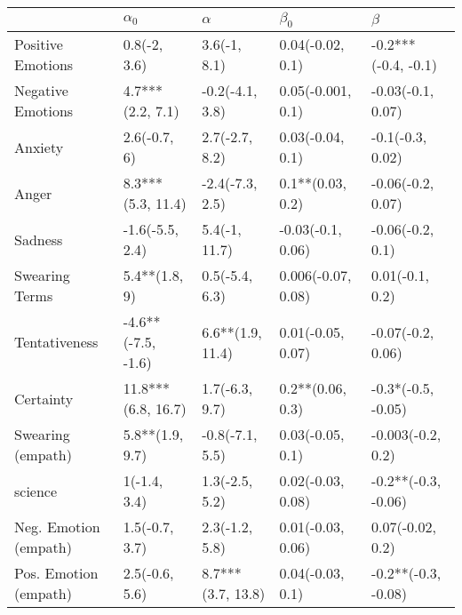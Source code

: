 \begin{tabular}{lllll}
\toprule
{} &          $\alpha_0$ &           $\alpha$ &           $\beta_0$ &              $\beta$ \\
\midrule
Positive Emotions     &        0.8(-2, 3.6) &       3.6(-1, 8.1) &    0.04(-0.02, 0.1) &  -0.2***(-0.4, -0.1) \\
Negative Emotions     &    4.7***(2.2, 7.1) &    -0.2(-4.1, 3.8) &   0.05(-0.001, 0.1) &    -0.03(-0.1, 0.07) \\
Anxiety               &        2.6(-0.7, 6) &     2.7(-2.7, 8.2) &    0.03(-0.04, 0.1) &     -0.1(-0.3, 0.02) \\
Anger                 &   8.3***(5.3, 11.4) &    -2.4(-7.3, 2.5) &    0.1**(0.03, 0.2) &    -0.06(-0.2, 0.07) \\
Sadness               &     -1.6(-5.5, 2.4) &      5.4(-1, 11.7) &   -0.03(-0.1, 0.06) &     -0.06(-0.2, 0.1) \\
Swearing Terms        &       5.4**(1.8, 9) &     0.5(-5.4, 6.3) &  0.006(-0.07, 0.08) &      0.01(-0.1, 0.2) \\
Tentativeness         &  -4.6**(-7.5, -1.6) &   6.6**(1.9, 11.4) &   0.01(-0.05, 0.07) &    -0.07(-0.2, 0.06) \\
Certainty             &  11.8***(6.8, 16.7) &     1.7(-6.3, 9.7) &    0.2**(0.06, 0.3) &   -0.3*(-0.5, -0.05) \\
Swearing (empath)     &     5.8**(1.9, 9.7) &    -0.8(-7.1, 5.5) &    0.03(-0.05, 0.1) &    -0.003(-0.2, 0.2) \\
science               &        1(-1.4, 3.4) &     1.3(-2.5, 5.2) &   0.02(-0.03, 0.08) &  -0.2**(-0.3, -0.06) \\
Neg. Emotion (empath) &      1.5(-0.7, 3.7) &     2.3(-1.2, 5.8) &   0.01(-0.03, 0.06) &     0.07(-0.02, 0.2) \\
Pos. Emotion (empath) &      2.5(-0.6, 5.6) &  8.7***(3.7, 13.8) &    0.04(-0.03, 0.1) &  -0.2**(-0.3, -0.08) \\
\bottomrule
\end{tabular}
